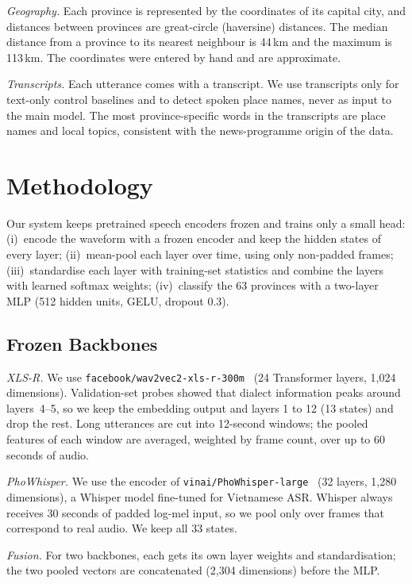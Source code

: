 \documentclass[conference]{IEEEtran}
\begin{document}
\textit{Geography.} Each province is represented by the coordinates of its capital city, and distances between provinces are great-circle (haversine) distances. The median distance from a province to its nearest neighbour is 44\,km and the maximum is 113\,km. The coordinates were entered by hand and are approximate.

\textit{Transcripts.} Each utterance comes with a transcript. We use transcripts only for text-only control baselines and to detect spoken place names, never as input to the main model. The most province-specific words in the transcripts are place names and local topics, consistent with the news-programme origin of the data.

\section{Methodology}
Our system keeps pretrained speech encoders frozen and trains only a small head: (i)~encode the waveform with a frozen encoder and keep the hidden states of every layer; (ii)~mean-pool each layer over time, using only non-padded frames; (iii)~standardise each layer with training-set statistics and combine the layers with learned softmax weights; (iv)~classify the 63 provinces with a two-layer MLP (512 hidden units, GELU, dropout 0.3).

\subsection{Frozen Backbones}
\textit{XLS-R.} We use \nolinkurl{facebook/wav2vec2-xls-r-300m}~\cite{xlsr} (24 Transformer layers, 1,024 dimensions). Validation-set probes showed that dialect information peaks around layers~4--5, so we keep the embedding output and layers 1 to 12 (13 states) and drop the rest. Long utterances are cut into 12-second windows; the pooled features of each window are averaged, weighted by frame count, over up to 60 seconds of audio.

\textit{PhoWhisper.} We use the encoder of \nolinkurl{vinai/PhoWhisper-large}~\cite{phowhisper} (32 layers, 1,280 dimensions), a Whisper model fine-tuned for Vietnamese ASR. Whisper always receives 30 seconds of padded log-mel input, so we pool only over frames that correspond to real audio. We keep all 33 states.

\textit{Fusion.} For two backbones, each gets its own layer weights and standardisation; the two pooled vectors are concatenated (2,304 dimensions) before the MLP.
\end{document}
